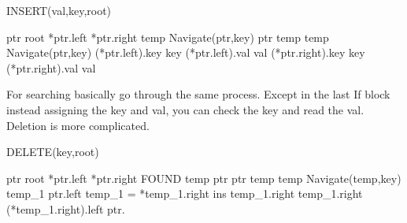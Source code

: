 \documentclass{myclass}
\begin{document}
\begin{algorithm}
    \caption*{INSERT(val,key,root)}
    \begin{algorithmic}[1]
        \State ptr \ass root
                \State {} *ptr.left
            \Else 
                \State {} *ptr.right
            \EndIf
        \EndProcedure
        \State temp \ass Navigate(ptr,key)
            \State ptr \ass temp
            \State temp \ass Navigate(ptr,key)
        \EndWhile
            \State (*ptr.left).key \ass key
            \State (*ptr.left).val \ass val
        \Else 
            \State (*ptr.right).key \ass key
            \State (*ptr.right).val \ass val
        \EndIf
    \end{algorithmic}
\end{algorithm}

For searching basically go through the same process. Except in the last If block instead assigning the key and val,
you can check the key and read the val. Deletion is more complicated.

\begin{algorithm}
    \caption*{DELETE(key,root)}
    \begin{algorithmic}[1]
        \State ptr \ass root
                \State {} *ptr.left
                \State {} *ptr.right
            \Else 
                \State {} FOUND
            \EndIf
        \EndProcedure
        \State temp \ass ptr
            \State ptr \ass temp
            \State temp \ass Navigate(temp,key)
        \EndWhile
            \State temp\_1 \ass *ptr.left
                \State temp\_1 = *temp\_1.right
            \EndWhile
            \State ins \ass *temp\_1.right
            \State *temp\_1.right \ass *(*temp\_1.right).left
            \State *ptr.
        \EndIf



    \end{algorithmic}
\end{algorithm}
\end{document}
